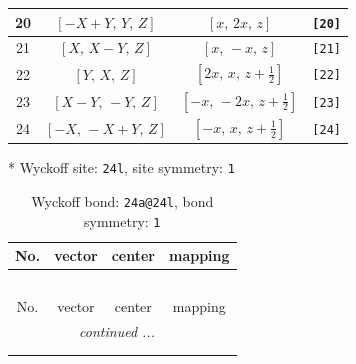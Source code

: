 \documentclass[fleqn,8pt]{jsarticle}
\begin{document}
\begin{longtable}{cccc}
20 & $\left[ - X + Y,\, Y,\, Z \right]$ & $\left[ x,\, 2 x,\, z \right]$ & {\tt [20]} \\ \hline
21 & $\left[ X,\, X - Y,\, Z \right]$ & $\left[ x,\, - x,\, z \right]$ & {\tt [21]} \\ \hline
22 & $\left[ Y,\, X,\, Z \right]$ & $\left[ 2 x,\, x,\, z + \frac{1}{2} \right]$ & {\tt [22]} \\ \hline
23 & $\left[ X - Y,\, - Y,\, Z \right]$ & $\left[ - x,\, - 2 x,\, z + \frac{1}{2} \right]$ & {\tt [23]} \\ \hline
24 & $\left[ - X,\, - X + Y,\, Z \right]$ & $\left[ - x,\, x,\, z + \frac{1}{2} \right]$ & {\tt [24]} \\
\end{longtable}
* Wyckoff site: {\tt 24l}, site symmetry: {\tt 1}
\renewcommand{\arraystretch}{1.2}
\begin{longtable}{cccc}
\caption{Wyckoff bond: {\tt 24a@24l}, bond symmetry: {\tt 1}}
 \\
 \hline \hline
No. & vector & center & mapping \\ \hline \endfirsthead

\multicolumn{3}{l}{\tablename\ \thetable{}} \\
 \hline \hline
No. & vector & center & mapping \\ \hline \endhead

 \hline \hline
\multicolumn{3}{r}{\footnotesize\it continued ...} \\ \endfoot

 \hline \hline
\multicolumn{3}{r}{} \\ \endlastfoot


\end{longtable}
\end{document}
